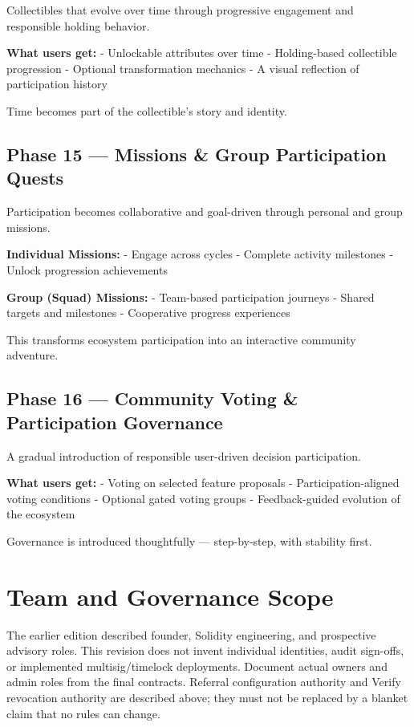 \documentclass[
  10pt,
  letterpaper,
]{article}
\begin{document}
Collectibles that evolve over time through progressive engagement and
responsible holding behavior.

\textbf{What users get:} - Unlockable attributes over time -
Holding-based collectible progression - Optional transformation
mechanics - A visual reflection of participation history

Time becomes part of the collectible's story and identity.

\subsection{Phase 15 --- Missions \& Group Participation
Quests}\label{phase-15-missions-group-participation-quests}

Participation becomes collaborative and goal-driven through personal and
group missions.

\textbf{Individual Missions:} - Engage across cycles - Complete activity
milestones - Unlock progression achievements

\textbf{Group (Squad) Missions:} - Team-based participation journeys -
Shared targets and milestones - Cooperative progress experiences

This transforms ecosystem participation into an interactive community
adventure.

\subsection{Phase 16 --- Community Voting \& Participation
Governance}\label{phase-16-community-voting-participation-governance}

A gradual introduction of responsible user-driven decision
participation.

\textbf{What users get:} - Voting on selected feature proposals -
Participation-aligned voting conditions - Optional gated voting groups -
Feedback-guided evolution of the ecosystem

Governance is introduced thoughtfully --- step-by-step, with stability
first.

\section{Team and Governance Scope}\label{team-and-governance-scope}

The earlier edition described founder, Solidity engineering, and
prospective advisory roles. This revision does not invent individual
identities, audit sign-offs, or implemented multisig/timelock
deployments. Document actual owners and admin roles from the final
contracts. Referral configuration authority and Verify revocation
authority are described above; they must not be replaced by a blanket
claim that no rules can change.
\end{document}
